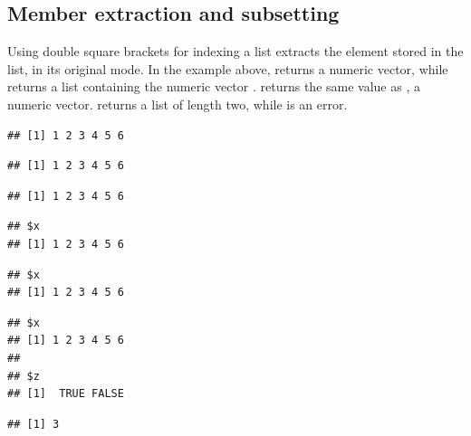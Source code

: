 \documentclass[krantz2]{krantz}\usepackage{knitr}
\begin{document}
\subsection{Member extraction and subsetting}
Using\qRoperator{[[]]} double square brackets for indexing a list extracts the element stored in the list, in its original mode. In the example above,  returns a numeric vector, while  returns a list containing the numeric vector .  returns the same value as , a numeric vector.  returns a list of length two, while  is an error.

\begin{knitrout}\footnotesize
{}\color{fgcolor}\begin{kframe}
\begin{alltt}
\hlopt{$}
\end{alltt}
\begin{verbatim}
## [1] 1 2 3 4 5 6
\end{verbatim}
\begin{alltt}
\hlstd{a.list[[}\hlstd{]]}
\end{alltt}
\begin{verbatim}
## [1] 1 2 3 4 5 6
\end{verbatim}
\begin{alltt}
\hlstd{a.list[[}\hlstd{]]}
\end{alltt}
\begin{verbatim}
## [1] 1 2 3 4 5 6
\end{verbatim}
\begin{alltt}
\hlstd{a.list[}\hlstd{]}
\end{alltt}
\begin{verbatim}
## $x
## [1] 1 2 3 4 5 6
\end{verbatim}
\begin{alltt}
\hlstd{a.list[}\hlstd{]}
\end{alltt}
\begin{verbatim}
## $x
## [1] 1 2 3 4 5 6
\end{verbatim}
\begin{alltt}
\hlstd{a.list[}\hlstd{(}\hlstd{,}\hlstd{)]}
\end{alltt}
\begin{verbatim}
## $x
## [1] 1 2 3 4 5 6
## 
## $z
## [1]  TRUE FALSE
\end{verbatim}
\begin{alltt}
\hlstd{(a.list[[}\hlstd{(}\hlstd{,}\hlstd{)]])}
\end{alltt}
\begin{verbatim}
## [1] 3
\end{verbatim}
\end{kframe}
\end{knitrout}
\end{document}
